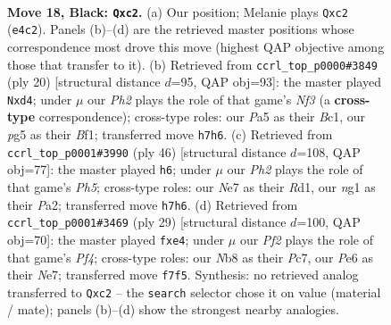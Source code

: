 \documentclass[11pt]{article}
\begin{document}
\clearpage

\begin{figure}[p]\centering
\begin{subfigure}{0.46\textwidth}\centering
\resizebox{\linewidth}{!}{%
\newchessgame
\chessboard[
  setfen={rnb1r3/1p2npkp/4p3/p1P1P1PQ/4qP2/P7/2P1B3/R1B1K1NR b KQ - 4 18},
  showmover=false,
  pgfstyle=straightmove, color=movearrow, markmove={e4-c2}
]}
\caption{}
\end{subfigure}\hfill
\begin{subfigure}{0.46\textwidth}\centering
\resizebox{\linewidth}{!}{%
\newchessgame
\chessboard[
  setfen={r1b1k2r/ppp1b1pp/2n2q2/8/3pQ3/2P2N2/PP3PPP/R1B1KB1R w KQkq - 1 11},
  showmover=false,
  pgfstyle=straightmove, color=movearrow, markmove={f3-d4}
]}
\caption{}
\end{subfigure}
\\[4pt]
\begin{subfigure}{0.46\textwidth}\centering
\resizebox{\linewidth}{!}{%
\newchessgame
\chessboard[
  setfen={2rq1bk1/p2n1pp1/2p5/3p1Q1P/N3r1p1/2B3P1/PP2PP2/2RR2K1 w - - 1 24},
  showmover=false,
  pgfstyle=straightmove, color=movearrow, markmove={h5-h6}
]}
\caption{}
\end{subfigure}\hfill
\begin{subfigure}{0.46\textwidth}\centering
\resizebox{\linewidth}{!}{%
\newchessgame
\chessboard[
  setfen={r6k/p1p1nBpp/b7/2b2p1Q/3qP3/3P4/PPP3PP/R1B1K2R b KQ - 0 15},
  showmover=false,
  pgfstyle=straightmove, color=movearrow, markmove={f5-e4}
]}
\caption{}
\end{subfigure}
\caption{\textbf{Move 18, Black: \texttt{Qxc2}.} (a) Our position; Melanie plays \texttt{Qxc2} (\texttt{e4c2}). Panels (b)--(d) are the retrieved master positions whose correspondence most drove this move (highest QAP objective among those that transfer to it). (b) Retrieved from \texttt{ccrl\_top\_p0000\#3849} (ply 20) [structural distance $d$=95, QAP obj=93]: the master played \texttt{Nxd4}; under $\mu$ our \emph{Ph2} plays the role of that game's \emph{Nf3} (a \textbf{cross-type} correspondence); cross-type roles: our \emph{P}a5 as their \emph{B}c1, our \emph{p}g5 as their \emph{B}f1; transferred move \texttt{h7h6}. (c) Retrieved from \texttt{ccrl\_top\_p0001\#3990} (ply 46) [structural distance $d$=108, QAP obj=77]: the master played \texttt{h6}; under $\mu$ our \emph{Ph2} plays the role of that game's \emph{Ph5}; cross-type roles: our \emph{N}e7 as their \emph{R}d1, our \emph{n}g1 as their \emph{P}a2; transferred move \texttt{h7h6}. (d) Retrieved from \texttt{ccrl\_top\_p0001\#3469} (ply 29) [structural distance $d$=100, QAP obj=70]: the master played \texttt{fxe4}; under $\mu$ our \emph{Pf2} plays the role of that game's \emph{Pf4}; cross-type roles: our \emph{N}b8 as their \emph{P}c7, our \emph{P}e6 as their \emph{N}e7; transferred move \texttt{f7f5}. Synthesis: no retrieved analog transferred to \texttt{Qxc2} -- the \texttt{search} selector chose it on value (material / mate); panels (b)--(d) show the strongest nearby analogies.}
\label{fig:thought-m35}
\end{figure}
\end{document}

